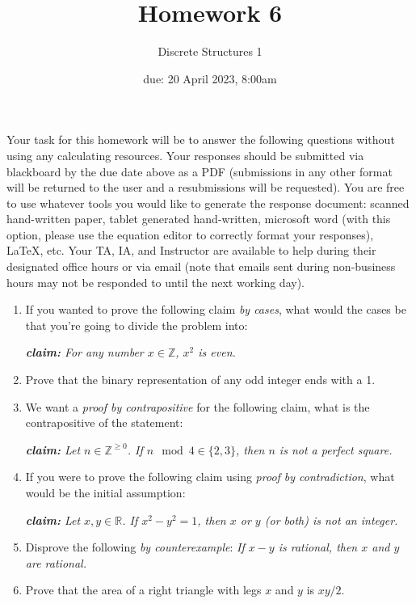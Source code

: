 \documentclass[11pt, oneside]{article}   	%
\title{Homework 6}
\author{Discrete Structures 1}
\date{due: 20 April 2023, 8:00am}							%
\newcommand{\reals}{\mathbb{R}}
\newcommand{\ints}{\mathbb{Z}}
\begin{document}
\maketitle

Your task for this homework will be to answer the following questions without using any calculating resources. 
Your responses should be submitted via blackboard by the due date above as a PDF (submissions in any other format will be returned to the user and a resubmissions will be requested). 
You are free to use whatever tools you would like to generate the response document: 
scanned hand-written paper, 
tablet generated hand-written, 
microsoft word (with this option, please use the equation editor to correctly format your responses), 
\LaTeX, etc.
Your TA, IA, and Instructor are available to help during their designated office hours or via email 
(note that emails sent during non-business hours may not be responded to until the next working day). 

\begin{enumerate}
\item If you wanted to prove the following claim \emph{by cases}, what would the cases be that you're going to divide the problem into:
\begin{center}
\textit{\textbf{claim:} For any number $x\in\ints$, $x^2$ is even.}
\end{center}

\item Prove that the binary representation of any odd integer ends with a 1.

\item We want a \emph{proof by contrapositive} for the following claim, what is the contrapositive of the statement:
\begin{center}
\textit{\textbf{claim:} Let $n\in\ints^{\ge0}$. If $n\mod4\in\{2,3\}$, then $n$ is not a perfect square.}
\end{center}

\item If you were to prove the following claim using \emph{proof by contradiction}, what would be the initial assumption:
\begin{center}
\textit{\textbf{claim:} Let $x, y \in\reals$.  If $x^2-y^2 = 1$, then $x$ or $y$ (or both) is not an integer.}
\end{center}

\item Disprove the following \emph{by counterexample}: \textit{If $x-y$ is rational, then $x$ and $y$ are rational.}

\item Prove that the area of a right triangle with legs $x$ and $y$ is $xy/2$.

\end{enumerate}
\end{document}
